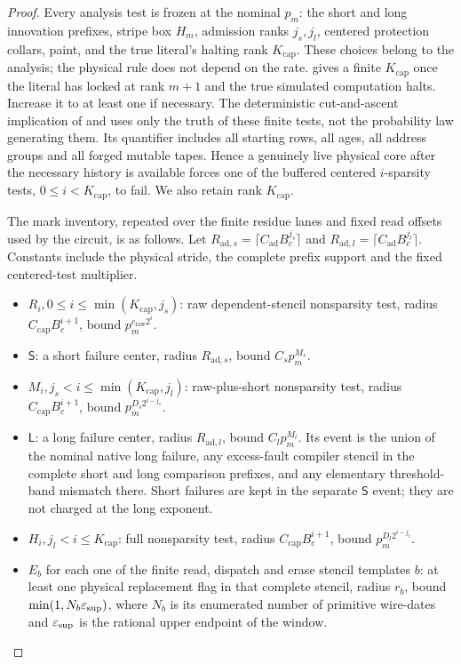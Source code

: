 \begin{proof}
Every analysis test is frozen at the nominal \(p_{m}\): the short and long innovation prefixes, stripe box \(H_{m}\), admission ranks \(j_{s},j_{l}\), centered protection collars, paint, and the true literal's halting rank \(K_{\mathrm{cap}}\). These choices belong to the analysis; the physical rule does not depend on the rate. \cite[Lemma~\ref*{cl:lem:locking}]{DMNoise1D2026} gives a finite \(K_{\mathrm{cap}}\) once the literal has locked at rank \(m+1\) and the true simulated computation halts. Increase it to at least one if necessary. The deterministic cut-and-ascent implication of \cite[Lemma~\ref*{cl:lem:cap-cut}]{DMNoise1D2026} and \cite[Lemma~\ref*{cl:lem:ascent}]{DMNoise1D2026} uses only the truth of these finite tests, not the probability law generating them. Its quantifier includes all starting rows, all ages, all address groups and all forged mutable tapes. Hence a genuinely live physical core after the necessary history is available forces one of the buffered centered \(i\)-sparsity tests, \(0\le i<K_{\mathrm{cap}}\), to fail. We also retain rank \(K_{\mathrm{cap}}\).

The mark inventory, repeated over the finite residue lanes and fixed read offsets used by the circuit, is as follows. Let \(R_{\mathrm{ad},s}=\lceil C_{\mathrm{ad}} B_{c}^{j_{s}}\rceil\) and \(R_{\mathrm{ad},l}=\lceil C_{\mathrm{ad}} B_{c}^{j_{l}}\rceil\). Constants include the physical stride, the complete prefix support and the fixed centered-test multiplier.

\begin{itemize}
\item \(R_{i}, 0\le i\le \min (K_{\mathrm{cap}},j_{s})\): raw dependent-stencil nonsparsity test, radius \(C_{\mathrm{cap}} B_{c}^{i+1}\), bound \(p_{m}^{c_{\mathrm{raw}} 2^{i}}\).
\item \(\mathsf S\): a short failure center, radius \(R_{\mathrm{ad},s}\), bound \(C_{s} p_{m}^{M_{s}}\).
\item \(M_{i}, j_{s}<i\le \min (K_{\mathrm{cap}},j_{l})\): raw-plus-short nonsparsity test, radius \(C_{\mathrm{cap}} B_{c}^{i+1}\), bound \(p_{m}^{D_{s} 2^{i-j_{s}}}\).
\item \(\mathsf L\): a long failure center, radius \(R_{\mathrm{ad},l}\), bound \(C_{l} p_{m}^{M_{l}}\). Its event is the union of the nominal native long failure, any excess-fault compiler stencil in the complete short and long comparison prefixes, and any elementary threshold-band mismatch there. Short failures are kept in the separate \(\mathsf S\) event; they are not charged at the long exponent.
\item \(H_{i}, j_{l}<i\le K_{\mathrm{cap}}\): full nonsparsity test, radius \(C_{\mathrm{cap}} B_{c}^{i+1}\), bound \(p_{m}^{D_{l} 2^{i-j_{l}}}\).
\item \(E_{b}\) for each one of the finite read, dispatch and erase stencil templates \(b\): at least one physical replacement flag in that complete stencil, radius \(r_{b}\), bound \(\min (1,N_{b} \varepsilon_{\mathrm{sup}})\), where \(N_{b}\) is its enumerated number of primitive wire-dates and \(\varepsilon_{\mathrm{sup}}\) is the rational upper endpoint of the window.
\end{itemize}


\end{proof}
